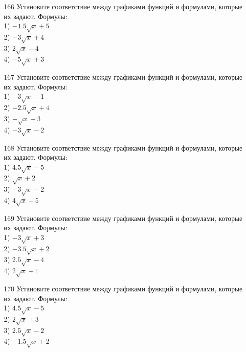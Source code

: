 \documentclass[4apaper]{article}
\begin{document}
\begin{taskBN}{166}
Установите соответствие между графиками функций и формулами, которые их задают. Формулы: \\1) $-1.5\sqrt{x}+5$\\2) $-3\sqrt{x}+4$\\3) $2\sqrt{x}-4$\\4) $-5\sqrt{x}+3$
\end{taskBN}

\begin{taskBN}{167}
Установите соответствие между графиками функций и формулами, которые их задают. Формулы: \\1) $-3\sqrt{x}-1$\\2) $-2.5\sqrt{x}+4$\\3) $-\sqrt{x}+3$\\4) $-3\sqrt{x}-2$
\end{taskBN}

\begin{taskBN}{168}
Установите соответствие между графиками функций и формулами, которые их задают. Формулы: \\1) $4.5\sqrt{x}-5$\\2) $\sqrt{x}+2$\\3) $-3\sqrt{x}-2$\\4) $4\sqrt{x}-5$
\end{taskBN}

\begin{taskBN}{169}
Установите соответствие между графиками функций и формулами, которые их задают. Формулы: \\1) $-3\sqrt{x}+3$\\2) $-3.5\sqrt{x}+2$\\3) $2.5\sqrt{x}-4$\\4) $2\sqrt{x}+1$
\end{taskBN}

\begin{taskBN}{170}
Установите соответствие между графиками функций и формулами, которые их задают. Формулы: \\1) $4.5\sqrt{x}-5$\\2) $2\sqrt{x}+3$\\3) $2.5\sqrt{x}-2$\\4) $-1.5\sqrt{x}+2$
\end{taskBN}
\end{document}

